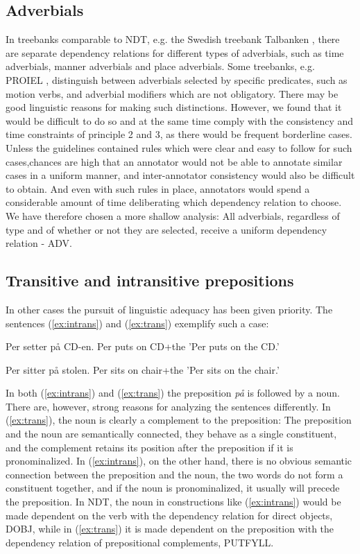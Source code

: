 \documentclass[11pt,a4paper]{article}
\begin{document}
\subsection{Adverbials}
In treebanks comparable to NDT, e.g. the Swedish treebank Talbanken \cite{Niv:Nil:Hal:2006}, there are separate dependency relations for different types of adverbials, such as time adverbials, manner adverbials and place adverbials. Some treebanks, e.g. PROIEL \cite{Hau:Joh:Eck:Wel:Her:Mut:2009}, distinguish between adverbials selected by specific predicates, such as motion verbs, and adverbial modifiers which are not obligatory. There may be good linguistic reasons for making such distinctions. However, we found that it would be difficult to do so and at the same time comply with the consistency and time constraints of principle 2 and 3, as there would be frequent borderline cases. Unless the guidelines contained rules which were clear and easy to follow for such cases,chances are high that an annotator would not be able to annotate similar cases in a uniform manner, and inter-annotator consistency would also be difficult to obtain. And even with such rules in place, annotators would spend a considerable amount of time deliberating which dependency relation to choose. We have therefore chosen a more shallow analysis: All adverbials, regardless of type and of whether or not they are selected, receive a uniform dependency relation - ADV.

\subsection{Transitive and intransitive prepositions}
In other cases the pursuit of linguistic adequacy has been given priority. The sentences (\ref{ex:intrans}) and (\ref{ex:trans}) exemplify such a case:

\begin{examples}
\item\label{ex:intrans}
\gll Per setter på CD-en.
Per puts on CD+the
\glt 'Per puts on the CD.'
\glend

\item\label{ex:trans}
\gll Per sitter på stolen.
Per sits on chair+the
\glt 'Per sits on the chair.'
\glend
\end{examples}

In both (\ref{ex:intrans}) and (\ref{ex:trans}) the preposition \emph{på} is followed by a noun. There are, however, strong reasons for analyzing the sentences differently. In (\ref{ex:trans}), the noun is clearly a complement to the preposition: The preposition and the noun are semantically connected, they behave as a single constituent, and the complement retains its position after the preposition if it is pronominalized. In (\ref{ex:intrans}), on the other hand, there is no obvious semantic connection between the preposition and the noun, the two words do not form a constituent together, and if the noun is pronominalized, it usually will precede the preposition. In NDT, the noun in constructions like (\ref{ex:intrans}) would be made dependent on the verb with the dependency relation for direct objects, DOBJ, while in (\ref{ex:trans}) it is made dependent on the preposition with the dependency relation of prepositional complements, PUTFYLL.
\end{document}
